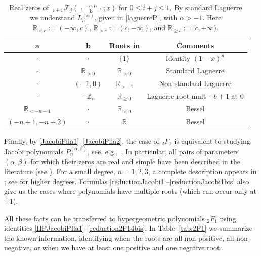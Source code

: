 \documentclass[reqno,11pt]{amsart}
\theoremstyle{remark}
\newcommand{\R}{\mathbb{R}}
\newcommand{\Z}{\mathbb{Z}}
\newcommand*\pFq[5]{%
 {\ }_{#1}{\mathcal F}_{#2}{\left(\genfrac..{0pt}{}{#3}{#4};#5\right)}%
}
\begin{document}
\begin{table}[h]
    \centering    
\begin{tabular}{|c|c|c|c|}
\hline $\mathbf{a}$ & $\mathbf{b}$ & \textbf{Roots in} & \textbf{Comments} \\
\hline $\cdot$ & $\cdot$ & $\{1\}$ & Identity $(1-x)^n$ \\
\hline $\cdot$ & $\R_{>0}$ & $\R_{>0}$ & Standard Laguerre \\
\hline $\cdot$ & $(-1,0)$ & $\R_{>-1}$ & Non-standard Laguerre \\
\hline $\cdot$ & $- \Z_n$ & {$\R_{\geq 0}$} & Laguerre root mult $-b+1$ at 0 \\
\hline $\R_{<-n+1}$ & $\cdot$ & $\R_{<0}$ & Bessel \\
\hline $(-n+1,-n+2)$ & $\cdot$ & $\mathbb{R}$ & Bessel  \\
\hline
\end{tabular}
\vspace{2mm}
\caption{Real zeros of $\pFq{i+1}{j}{-n, \bm a}{\bm b}{x}$ for $0\le i+j \le 1$. By standard Laguerre we understand $L_n^{(\alpha)}$, given in \eqref{laguerreP}, with $\alpha>-1$. Here $\R_{<c}:= (-\infty,c)$,  $\R_{>c}:= (c,+\infty )$, and $\R_{\ge c}:= [c,+\infty )$. }
    \label{tab:1F1}
\end{table}

\medskip

Finally, by \eqref{JacobiPfla1}--\eqref{JacobiPfla2}, the case of ${}_2 F_1$  is equivalent to studying Jacobi polynomials $P_n^{(\alpha,\beta)}$, see, e.g.,~\cite{MR2723248, szego1975orthogonal}. In particular, all pairs of parameters $(\alpha, \beta)$ for which their zeros are real and simple have been described in the literature (see \cite{dominici2013real}). For a small degree, $n=1,2,3$, a complete description appears in \cite[Prop. 4]{dominici2013real}; see \cite[Thm. 5]{dominici2013real} for higher degrees.  Formulas \eqref{reductionJacobi1}--\eqref{reductionJacobi1bis} also give us the cases where polynomials have multiple roots (which can occur only at $\pm 1$). 

All these facts can be transferred to hypergeometric polynomials $_2F_1$ using identities \eqref{HPJacobiPfla1}--\eqref{reduction2F14bis}. In Table~\ref{tab:2F1}  we summarize the known information, identifying when the roots are all non-positive, all non-negative, or when we have at least one positive and one negative root.
\end{document}
